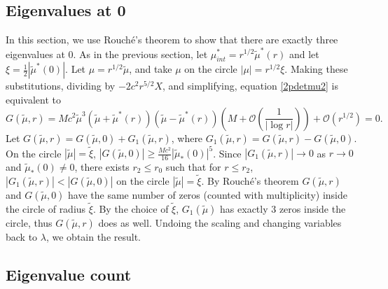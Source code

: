 \documentclass[10pt,reqno]{amsart}
\theoremstyle{plain}
\theoremstyle{definition}
\theoremstyle{remark}
\numberwithin{theorem}{section}
\numberwithin{equation}{section}
\begin{document}
\subsection{Eigenvalues at 0}\label{sec:asymmeigcount0}

In this section, we use Rouch\'{e}'s theorem to show that there are exactly three eigenvalues at 0. As in the previous section, let $\mu^*_{int} = r^{1/2} \tilde{\mu}^*(r)$ and let $\xi = \frac{1}{2}|\tilde{\mu}^*(0)|$. Let $\mu = r^{1/2} \tilde{\mu}$, and take $\mu$ on the circle $|\mu| = r^{1/2} \xi$. Making these substitutions, dividing by $-2 c^2 r^{5/2} X$, and simplifying, equation \cref{2pdetmu2} is equivalent to
\begin{equation}\label{def:eig0G}
G(\tilde{\mu}, r) = M c^2 \tilde{\mu}^3 (\tilde{\mu} + \tilde{\mu}^*(r))(\tilde{\mu} - \tilde{\mu}^*(r))
\left( M + \mathcal{O}\left(\frac{1}{|\log r|} \right) \right)
 + \mathcal{O}\left( r^{1/2} \right) = 0.
\end{equation}
Let $G(\tilde{\mu}, r) = G(\tilde{\mu}, 0) + G_1(\tilde{\mu}, r)$, where $G_1(\tilde{\mu}, r) = G(\tilde{\mu}, r) - G(\tilde{\mu}, 0)$. On the circle $|\tilde{\mu}| = \tilde{\xi}$, $|G(\tilde{\mu}, 0)| \geq \frac{Mc^2}{16}|\tilde{\mu}_*(0)|^5$. Since $|G_1(\tilde{\mu}, r)| \rightarrow 0$ as $r \rightarrow 0$ and $\tilde{\mu}_*(0) \neq 0$, there exists $r_2 \leq r_0$ such that for $r \leq r_2$, $|G_1(\tilde{\mu}, r)| < |G(\tilde{\mu}, 0)|$ on the circle $|\tilde{\mu}| = \tilde{\xi}$. By Rouch\'{e}'s theorem $G(\tilde{\mu}, r)$ and $G(\tilde{\mu}, 0)$ have the same number of zeros (counted with multiplicity) inside the circle of radius $\tilde{\xi}$. By the choice of $\tilde{\xi}$, $G_1(\tilde{\mu})$ has exactly 3 zeros inside the circle, thus $G(\tilde{\mu}, r)$ does as well. Undoing the scaling and changing variables back to $\lambda$, we obtain the result.

\subsection{Eigenvalue count}
\end{document}
